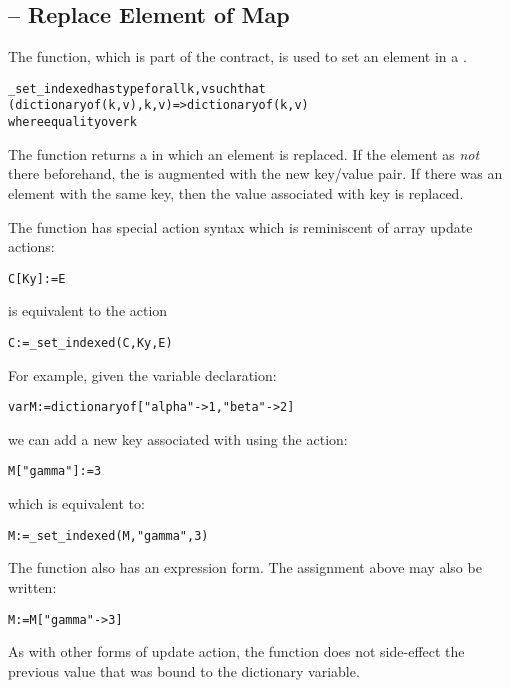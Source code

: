 \subsection{ -- Replace Element of Map}
\label{mapReplaceFunction}
The  function, which is part of the  contract, is used to set an element in a .
\begin{alltt}
\_set\_indexed has type for all k,v such that
                        (dictionary of (k,v),k,v)=>dictionary of (k,v)
                        where equality over k
\end{alltt}
The  function returns a  in which an element is replaced. If the element as \emph{not} there beforehand, the  is augmented with the new key/value pair. If there was an element with the same key, then the value associated with key is replaced.

The  function has special action syntax which is reminiscent of array update actions:
\begin{alltt}
C[Ky] := E
\end{alltt}
is equivalent to the action
\begin{alltt}
C := \_set\_indexed(C,Ky,E)
\end{alltt}
For example, given the variable declaration:
\begin{alltt}
var M := dictionary of [ "alpha"->1, "beta"->2 ]
\end{alltt}
we can add a new key associated with  using the action:
\begin{alltt}
M["gamma"] := 3
\end{alltt}
which is equivalent to:
\begin{alltt}
M := _set_indexed(M,"gamma",3)
\end{alltt}
The  function also has an expression form. The assignment above may also be written:
\begin{alltt}
M := M["gamma"->3]
\end{alltt}

\begin{aside}
As with other forms of update action, the  function does not side-effect the previous value that was bound to the dictionary variable.
\end{aside}

